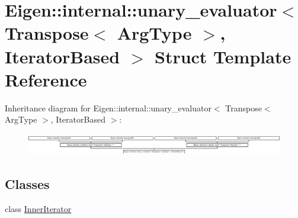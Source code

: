 \hypertarget{struct_eigen_1_1internal_1_1unary__evaluator_3_01_transpose_3_01_arg_type_01_4_00_01_iterator_based_01_4}{}\section{Eigen\+:\+:internal\+:\+:unary\+\_\+evaluator$<$ Transpose$<$ Arg\+Type $>$, Iterator\+Based $>$ Struct Template Reference}
\label{struct_eigen_1_1internal_1_1unary__evaluator_3_01_transpose_3_01_arg_type_01_4_00_01_iterator_based_01_4}
Inheritance diagram for Eigen\+:\+:internal\+:\+:unary\+\_\+evaluator$<$ Transpose$<$ Arg\+Type $>$, Iterator\+Based $>$\+:\begin{figure}[H]
\begin{center}
\leavevmode
\includegraphics[height=0.956720cm]{struct_eigen_1_1internal_1_1unary__evaluator_3_01_transpose_3_01_arg_type_01_4_00_01_iterator_based_01_4}
\end{center}
\end{figure}
\subsection*{Classes}
\begin{DoxyCompactItemize}
\item 
class \hyperlink{class_eigen_1_1internal_1_1unary__evaluator_3_01_transpose_3_01_arg_type_01_4_00_01_iterator_based_01_4_1_1_inner_iterator}{Inner\+Iterator}
\end{DoxyCompactItemize}
